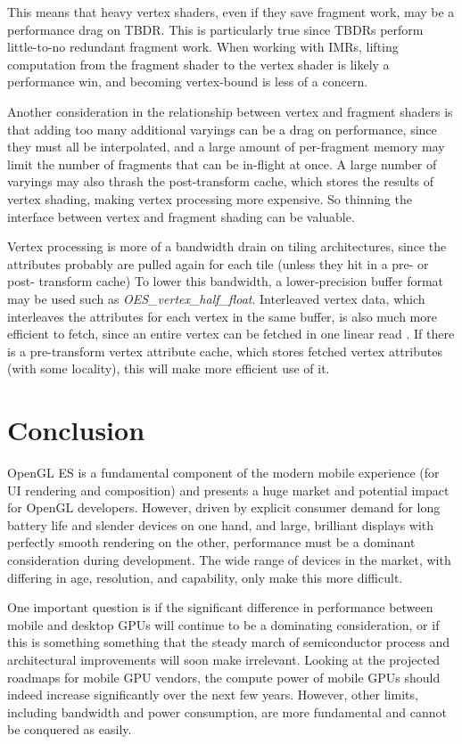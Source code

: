 This means that heavy vertex shaders, even if they save fragment work, may be a
performance drag on TBDR.  This is particularly true since TBDRs perform
little-to-no redundant fragment work.  When working with IMRs, lifting
computation from the fragment shader to the vertex shader is likely a
performance win, and becoming vertex-bound is less of a concern.

Another consideration in the relationship between vertex and fragment shaders
is that adding too many additional varyings can be a drag on performance, since
they must all be interpolated, and a large amount of per-fragment memory may
limit the number of fragments that can be in-flight at once.  A large number of
varyings may also thrash the post-transform cache, which stores the results of
vertex shading, making vertex processing more expensive.  So thinning the
interface between vertex and fragment shading can be valuable.

Vertex processing is more of a bandwidth drain on tiling architectures, since
the attributes probably are pulled again for each tile (unless they hit in a
pre- or post- transform cache)  To lower this bandwidth, a lower-precision
buffer format may be used such as \textit{OES\_vertex\_half\_float}.
Interleaved vertex data, which interleaves the attributes for each vertex in
the same buffer, is also much more efficient to fetch, since an entire vertex
can be fetched in one linear read \cite{Apple11}.  If there is a pre-transform
vertex attribute cache, which stores fetched vertex attributes (with some
locality), this will make more efficient use of it.

\section{Conclusion}\label{Jon-McCaffrey-Conclusion}

OpenGL ES is a fundamental component of the modern mobile experience (for UI
rendering and composition) \cite{Guy11} and presents a huge market and
potential impact for OpenGL developers.  However, driven by explicit consumer
demand for long battery life and slender devices on one hand, and large,
brilliant displays with perfectly smooth rendering on the other, performance
must be a dominant consideration during development.  The wide range of devices
in the market, with differing in age, resolution, and capability, only make
this more difficult.

One important question is if the significant difference in performance between
mobile and desktop GPUs will continue to be a dominating consideration, or if
this is something something that the steady march of semiconductor process and
architectural improvements will soon make irrelevant.  Looking at the projected
roadmaps for mobile GPU vendors, the compute power of mobile GPUs should indeed
increase significantly over the next few years.  However, other limits,
including bandwidth and power consumption, are more fundamental and cannot be
conquered as easily.

